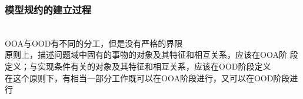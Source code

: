 \documentclass[compress]{beamer}
\begin{document}
\begin{frame}
  \frametitle{模型规约的建立过程}

  \\[2ex]

    OOA与OOD有不同的分工，但是没有严格的界限 \\

    \quad 原则上，描述问题域中固有的事物的对象及其特征和相互关系，应该在OOA阶
    段定义；与实现条件有关的对象及其特征和相互关系，应该在OOD阶段定义
    \\

    \quad 在这个原则下，有相当一部分工作既可以在OOA阶段进行，又可以在OOD阶段进
    行
\end{frame}
\end{document}

